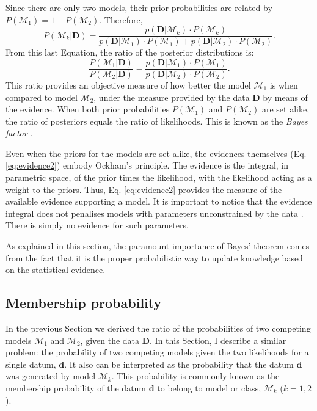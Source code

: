 Since there are only two models, their prior probabilities are related by $P(\mathcal{M}_1)= 1- P(\mathcal{M}_2)$. Therefore,
 \begin{equation}
P(\mathcal{M}_k|\mathbf{D})=\frac{p(\mathbf{D}|\mathcal{M}_k)\cdot P(\mathcal{M}_k)}{p(\mathbf{D}|\mathcal{M}_1)\cdot P(\mathcal{M}_1)+p(\mathbf{D}|\mathcal{M}_2)\cdot P(\mathcal{M}_2)}.
\end{equation}
From this last Equation, the ratio of the posterior distributions is:
\begin{equation}
\label{eq:modelselection}
\frac{P(\mathcal{M}_1|\mathbf{D})}{P(\mathcal{M}_2|\mathbf{D})}=\frac{p(\mathbf{D}|\mathcal{M}_1)\cdot P(\mathcal{M}_1)}{p(\mathbf{D}|\mathcal{M}_2)\cdot P(\mathcal{M}_2)}.
\end{equation}
This ratio provides an objective measure of how better the model $\mathcal{M}_1$ is when compared to model $\mathcal{M}_2$, under the measure provided by the data $\mathbf{D}$ by means of the evidence. When both prior probabilities  $P(\mathcal{M}_1)$ and $P(\mathcal{M}_2)$ are set alike, the ratio of posteriors equals the ratio of likelihoods. This is known as the \emph{Bayes factor} \cite[for a similar derivation and some examples of its application see][]{Kaas1995}. 

Even when the priors for the models are set alike, the evidences themselves (Eq. \ref{eq:evidence2}) embody Ockham's principle. The evidence is the integral, in parametric space, of the prior times the likelihood, with the likelihood acting as a weight to the priors. Thus, Eq. \ref{eq:evidence2} provides the measure of the available evidence supporting a model. It is important to notice that the evidence integral does not penalises models with parameters unconstrained by the data \citep{Trotta2008}. There is simply no evidence for such parameters. 

As explained in this section, the paramount importance of Bayes' theorem comes from the fact that it is the proper probabilistic way to update knowledge based on the {statistical} evidence.

\subsection{Membership probability}

In the previous Section we {derived} the ratio of the probabilities of two competing models $\mathcal{M}_1$ and $\mathcal{M}_2$, given the data $\mathbf{D}$. In this Section, I describe a similar problem: the probability of two competing models given the two likelihoods for a single datum, $\mathbf{d}$. It also can be interpreted as the probability that the datum $\mathbf{d}$ was generated by model $\mathcal{M}_k$. This probability is commonly known as the membership probability of the datum $\mathbf{d}$ to belong to model or class, $\mathcal{M}_k$ ($k=1,2$). 

